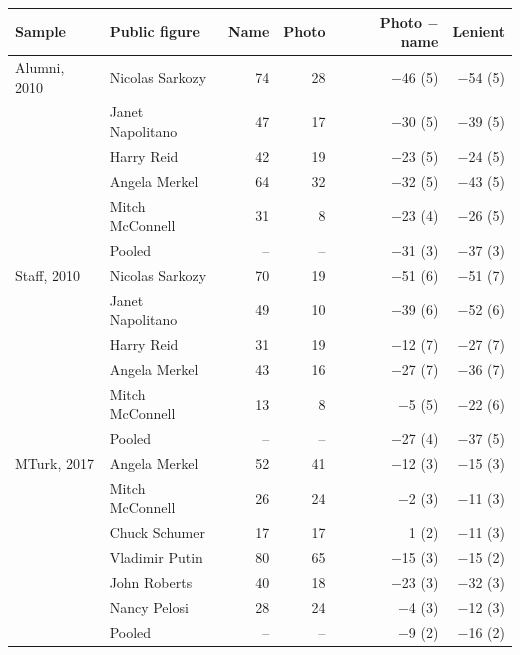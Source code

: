 \begin{tabular}{llrrrr}
\toprule
Sample & Public figure & Name & Photo & Photo $-$ name & Lenient \\
\midrule
Alumni, 2010 & Nicolas Sarkozy & 74 & 28 & $-$46 (5) & $-$54 (5) \\
 & Janet Napolitano & 47 & 17 & $-$30 (5) & $-$39 (5) \\
 & Harry Reid & 42 & 19 & $-$23 (5) & $-$24 (5) \\
 & Angela Merkel & 64 & 32 & $-$32 (5) & $-$43 (5) \\
 & Mitch McConnell & 31 & 8 & $-$23 (4) & $-$26 (5) \\
 & Pooled & -- & -- & $-$31 (3) & $-$37 (3) \\
Staff, 2010 & Nicolas Sarkozy & 70 & 19 & $-$51 (6) & $-$51 (7) \\
 & Janet Napolitano & 49 & 10 & $-$39 (6) & $-$52 (6) \\
 & Harry Reid & 31 & 19 & $-$12 (7) & $-$27 (7) \\
 & Angela Merkel & 43 & 16 & $-$27 (7) & $-$36 (7) \\
 & Mitch McConnell & 13 & 8 & $-$5 (5) & $-$22 (6) \\
 & Pooled & -- & -- & $-$27 (4) & $-$37 (5) \\
MTurk, 2017 & Angela Merkel & 52 & 41 & $-$12 (3) & $-$15 (3) \\
 & Mitch McConnell & 26 & 24 & $-$2 (3) & $-$11 (3) \\
 & Chuck Schumer & 17 & 17 & 1 (2) & $-$11 (3) \\
 & Vladimir Putin & 80 & 65 & $-$15 (3) & $-$15 (2) \\
 & John Roberts & 40 & 18 & $-$23 (3) & $-$32 (3) \\
 & Nancy Pelosi & 28 & 24 & $-$4 (3) & $-$12 (3) \\
 & Pooled & -- & -- & $-$9 (2) & $-$16 (2) \\
\bottomrule
\end{tabular}
